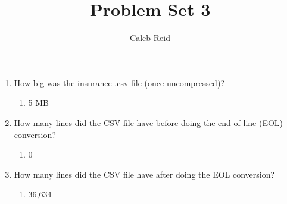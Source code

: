 \documentclass{article}
\title{Problem Set 3}
\author{Caleb Reid}
\begin{document}
    
\maketitle

\begin{enumerate}
\item How big was the insurance .csv file (once uncompressed)?
\begin{enumerate}
\item 5 MB
\end{enumerate}
\item How many lines did the CSV file have before doing the end-of-line (EOL) conversion?
\begin{enumerate}
\item 0
\end{enumerate}
\item How many lines did the CSV file have after doing the EOL conversion? 
\begin{enumerate}
\item 36,634
\end{enumerate}
\end{enumerate}
\end{document}
